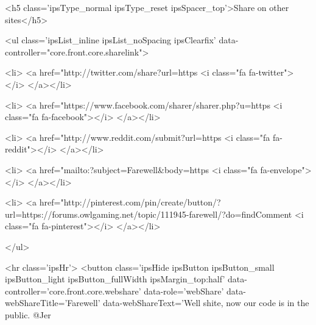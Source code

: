 	
	<h5 class='ipsType_normal ipsType_reset ipsSpacer_top'>Share on other sites</h5>
	

	<ul class='ipsList_inline ipsList_noSpacing ipsClearfix' data-controller="core.front.core.sharelink">
		
			<li>
<a href="http://twitter.com/share?url=https%
	<i class="fa fa-twitter"></i>
</a></li>
		
			<li>
<a href="https://www.facebook.com/sharer/sharer.php?u=https%
	<i class="fa fa-facebook"></i>
</a></li>
		
			<li>
<a href="http://www.reddit.com/submit?url=https%
	<i class="fa fa-reddit"></i>
</a></li>
		
			<li>
<a href="mailto:?subject=Farewell&body=https%
	<i class="fa fa-envelope"></i>
</a></li>
		
			<li>
<a href="http://pinterest.com/pin/create/button/?url=https://forums.owlgaming.net/topic/111945-farewell/?do=findComment%
	<i class="fa fa-pinterest"></i>
</a></li>
		
	</ul>


	<hr class='ipsHr'>
	<button class='ipsHide ipsButton ipsButton_small ipsButton_light ipsButton_fullWidth ipsMargin_top:half' data-controller='core.front.core.webshare' data-role='webShare' data-webShareTitle='Farewell' data-webShareText='Well shite, now our code is in the public. @Jer 
 


